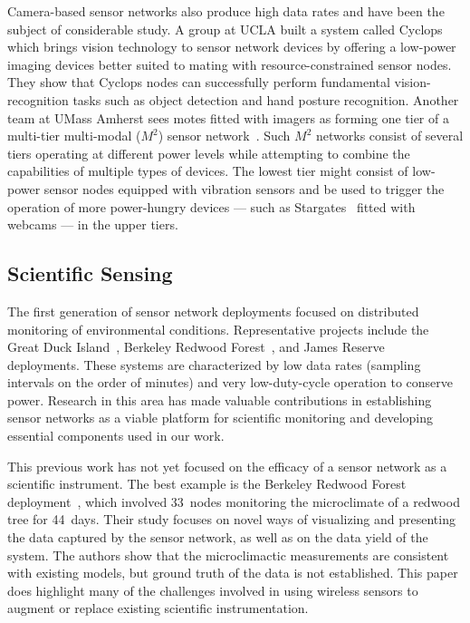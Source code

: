 Camera-based sensor networks also produce high data rates and have been the
subject of considerable study. A group at UCLA built a system called
Cyclops~\cite{cyclops-sensys05} which brings vision technology to sensor
network devices by offering a low-power imaging devices better suited to mating
with resource-constrained sensor nodes. They show that Cyclops nodes can
successfully perform fundamental vision-recognition tasks such as object
detection and hand posture recognition. Another team at UMass Amherst sees
motes fitted with imagers as forming one tier of a multi-tier multi-modal
($M^2$) sensor network~\cite{m2-nossdav05}. Such $M^2$ networks consist of
several tiers operating at different power levels while attempting to combine
the capabilities of multiple types of devices. The lowest tier might consist of
low-power sensor nodes equipped with vibration sensors and be used to trigger
the operation of more power-hungry devices --- such as
Stargates~\cite{stargate} fitted with webcams --- in the upper tiers.

\subsection{Scientific Sensing}

The first generation of sensor network deployments focused on distributed
monitoring of environmental conditions. Representative projects include the
Great Duck Island~\cite{spm:04habitat,polastre-masters,mainwaring-habitat},
Berkeley Redwood Forest~\cite{berkeley-redwoods}, and James
Reserve~\cite{cerpa-habitat} deployments. These systems are characterized by
low data rates (sampling intervals on the order of minutes) and very
low-duty-cycle operation to conserve power. Research in this area has made
valuable contributions in establishing sensor networks as a viable platform
for scientific monitoring and developing essential components used in our
work. 

This previous work has not yet focused on the efficacy of a sensor network as
a scientific instrument. The best example is the Berkeley Redwood Forest
deployment~\cite{berkeley-redwoods}, which involved 33~nodes monitoring the
microclimate of a redwood tree for 44~days. Their study focuses on novel ways
of visualizing and presenting the data captured by the sensor network, as
well as on the data yield of the system. The authors show that the
microclimactic measurements are consistent with existing models, but ground
truth of the data is not established. This paper does highlight many of the
challenges involved in using wireless sensors to augment or replace existing
scientific instrumentation.

